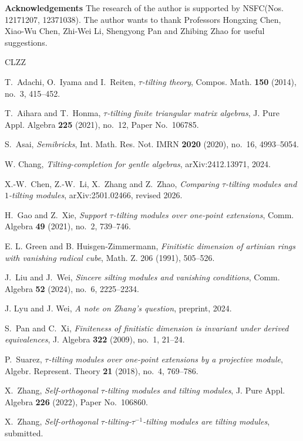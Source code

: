 \documentclass[a4paper,reqno]{amsart}
\theoremstyle{definition}
\numberwithin{equation}{section}
\begin{document}
{\bf Acknowledgements} The research of the author is supported by NSFC(Nos. 12171207, 12371038). The author wants to thank Professors Hongxing Chen, Xiao-Wu Chen, Zhi-Wei Li, Shengyong Pan and Zhibing Zhao for useful suggestions.

\begin{thebibliography}{CLZZ}

T.~Adachi, O.~Iyama and I.~Reiten,
\emph{$\tau$-tilting theory},
Compos. Math. \textbf{150} (2014), no.~3, 415--452.

T.~Aihara and T.~Honma,
\emph{$\tau$-tilting finite triangular matrix algebras},
J. Pure Appl. Algebra \textbf{225} (2021), no.~12,
Paper No.~106785.

S.~Asai,
\emph{Semibricks},
Int. Math. Res. Not. IMRN \textbf{2020} (2020), no.~16, 4993--5054.

 W. Chang, {\em Tilting-completion for gentle algebras}, arXiv:2412.13971, 2024.

X.-W.~Chen, Z.-W.~Li, X.~Zhang and Z.~Zhao,
\emph{Comparing $\tau$-tilting modules and $1$-tilting modules},
arXiv:2501.02466, revised 2026.

H.~Gao and Z.~Xie,
\emph{Support $\tau$-tilting modules over one-point extensions},
Comm. Algebra \textbf{49} (2021), no.~2, 739--746.

 E. L. Green and B. Huisgen-Zimmermann, \emph{Finitistic dimension of artinian rings with vanishing radical cube},
Math. Z. 206 (1991), 505--526.

J.~Liu and J.~Wei,
\emph{Sincere silting modules and vanishing conditions},
Comm. Algebra \textbf{52} (2024), no.~6, 2225--2234.

  J. Lyu and J. Wei, {\em A note on Zhang's question}, preprint, 2024.

S.~Pan and C.~Xi,
\emph{Finiteness of finitistic dimension is invariant under derived
equivalences},
J. Algebra \textbf{322} (2009), no.~1, 21--24.

P.~Suarez,
\emph{$\tau$-tilting modules over one-point extensions by a
projective module},
Algebr. Represent. Theory \textbf{21} (2018), no.~4, 769--786.

X.~Zhang,
\emph{Self-orthogonal $\tau$-tilting modules and tilting modules},
J. Pure Appl. Algebra \textbf{226} (2022), Paper No.~106860.

 X.~Zhang, \emph{Self-orthogonal $\tau$-tilting-$\tau^{-1}$-tilting modules are tilting modules}, submitted.


\end{thebibliography}
\end{document}
